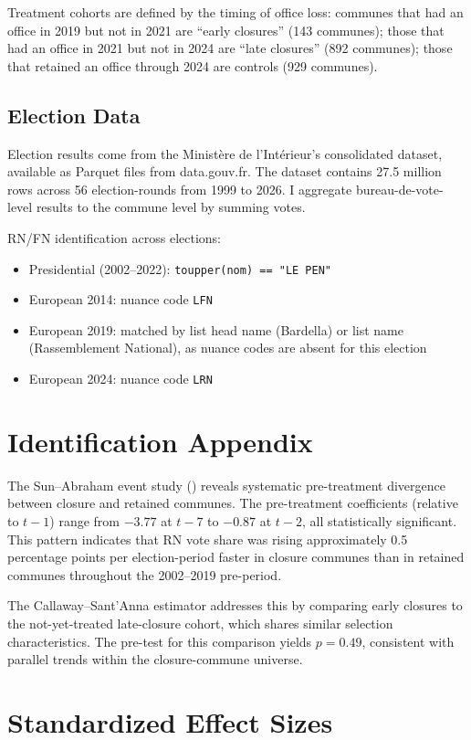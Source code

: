 \documentclass[12pt]{article}
\begin{document}
Treatment cohorts are defined by the timing of office loss: communes that had an office in 2019 but not in 2021 are ``early closures'' (143 communes); those that had an office in 2021 but not in 2024 are ``late closures'' (892 communes); those that retained an office through 2024 are controls (929 communes).

\subsection{Election Data}

Election results come from the Minist\`{e}re de l'Int\'{e}rieur's consolidated dataset, available as Parquet files from data.gouv.fr. The dataset contains 27.5 million rows across 56 election-rounds from 1999 to 2026. I aggregate bureau-de-vote-level results to the commune level by summing votes.

RN/FN identification across elections:
\begin{itemize}
\item Presidential (2002--2022): \texttt{toupper(nom) == "LE PEN"}
\item European 2014: nuance code \texttt{LFN}
\item European 2019: matched by list head name (Bardella) or list name (Rassemblement National), as nuance codes are absent for this election
\item European 2024: nuance code \texttt{LRN}
\end{itemize}

\section{Identification Appendix}

The Sun--Abraham event study () reveals systematic pre-treatment divergence between closure and retained communes. The pre-treatment coefficients (relative to $t-1$) range from $-3.77$ at $t-7$ to $-0.87$ at $t-2$, all statistically significant. This pattern indicates that RN vote share was rising approximately 0.5 percentage points per election-period faster in closure communes than in retained communes throughout the 2002--2019 pre-period.

The Callaway--Sant'Anna estimator addresses this by comparing early closures to the not-yet-treated late-closure cohort, which shares similar selection characteristics. The pre-test for this comparison yields $p=0.49$, consistent with parallel trends within the closure-commune universe.

\section{Standardized Effect Sizes}
\label{sec:sde}


\end{document}
